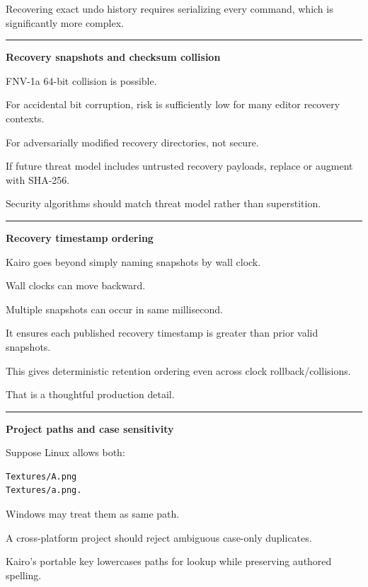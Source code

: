 Recovering exact undo history requires serializing every command, which is significantly more complex.

\begin{center}\rule{0.5\linewidth}{0.5pt}\end{center}

\textbf{Recovery snapshots and checksum collision}

FNV-1a 64-bit collision is possible.

For accidental bit corruption, risk is sufficiently low for many editor recovery contexts.

For adversarially modified recovery directories, not secure.

If future threat model includes untrusted recovery payloads, replace or augment with SHA-256.

Security algorithms should match threat model rather than superstition.

\begin{center}\rule{0.5\linewidth}{0.5pt}\end{center}

\textbf{Recovery timestamp ordering}

Kairo goes beyond simply naming snapshots by wall clock.

Wall clocks can move backward.

Multiple snapshots can occur in same millisecond.

It ensures each published recovery timestamp is greater than prior valid snapshots.

This gives deterministic retention ordering even across clock rollback/collisions.

That is a thoughtful production detail.

\begin{center}\rule{0.5\linewidth}{0.5pt}\end{center}

\textbf{Project paths and case sensitivity}

Suppose Linux allows both:

\begin{verbatim}
Textures/A.png
Textures/a.png.
\end{verbatim}

Windows may treat them as same path.

A cross-platform project should reject ambiguous case-only duplicates.

Kairo's portable key lowercases paths for lookup while preserving authored spelling.

